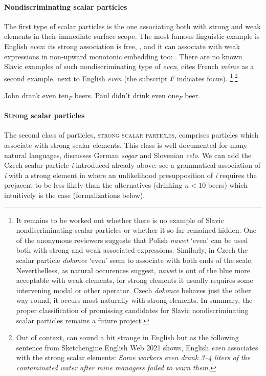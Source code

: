 \documentclass[output=paper,colorlinks,citecolor=brown]{langscibook}
\begin{document}
\paragraph{Nondiscriminating scalar particles}\label{nondiscriminating-scalar-particles}

The first type of scalar particles is the one associating both with strong and weak elements in their immediate surface scope. The most famous linguistic example is English \emph{even}: its strong association is free, , and it can associate with weak expressions in non-upward monotonic embedding too: . There are no known Slavic examples of such nondiscriminating type of \emph{even}, \citet[129]{Crnic2011} cites French \emph{même} as a second example, next to English \emph{even} (the subscript $F$ indicates focus).%
\footnote{It remains to be worked out whether there is no example of Slavic nondiscriminating scalar particles or whether it so far remained hidden. One of the anonymous reviewers suggests that Polish \textit{nawet} `even' can be used both with strong and weak associated expressions. Similarly, in Czech the scalar particle \textit{dokonce} `even' seem to associate with both ends of the scale. Neverthelless, as natural occurences suggest, \textit{nawet} is out of the blue more acceptable with weak elements, for strong elements it usually requires some intervening modal or other operator. Czech \textit{dokonce} behaves just the other way round, it occurs most naturally with strong elements. In summary, the proper classification of promissing candidates for Slavic nondiscriminating scalar particles remains a future project.}$^,$\footnote{Out of context,  can sound a bit strange in English but as the following sentence from Sketchengine \citep{kilgarriff2014sketch} English Web 2021 shows, English \textit{even} associates with the strong scalar elements: \textit{Some workers even drank 3--4 liters of the contaminated water after mine managers failed to warn them.}}

\ea \ea\label{ex:35} John drank even ten$_F$ beers.
\ex\label{ex:36} Paul didn't drink even one$_F$ beer.
\z
\z

\paragraph{Strong scalar particles}\label{strong-scalar-particles}

The second class of particles, \textsc{strong scalar particles}, comprises particles which associate with strong scalar elements. This class is well documented for many natural languages, \citet[130]{Crnic2011} discusses German \emph{sogar} and Slovenian \emph{celo}. We can add the Czech scalar particle \emph{i} introduced already above: see a grammatical association of \emph{i} with a strong element in  where an unlikelihood presupposition of \emph{i} requires the prejacent to be less likely than the alternatives (drinking \(n<10\) beers) which intuitively is the case (formalizations below).
\end{document}
